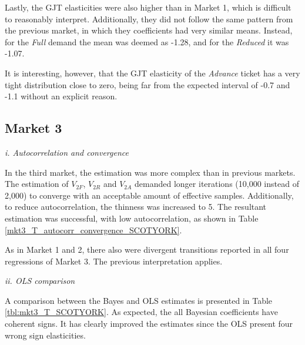 Lastly, the GJT elasticities were also higher than in Market 1, which is difficult to reasonably interpret. Additionally, they did not follow the same pattern from the previous market, in which they coefficients had very similar means. Instead, for the \textit{Full} demand the mean was deemed as -1.28, and for the \textit{Reduced} it was -1.07.

It is interesting, however, that the GJT elasticity of the \textit{Advance} ticket has a very tight distribution close to zero, being far from the expected interval of -0.7 and -1.1 \citep{pdfhv5} without an explicit reason.


\subsection{Market 3}

\textit{i. Autocorrelation and convergence}

In the third market, the estimation was more complex than in previous markets. The estimation of $V_{2F}$, $V_{2R}$ and $V_{2A}$ demanded longer iterations (10,000 instead of 2,000) to converge with an acceptable amount of effective samples. Additionally, to reduce autocorrelation, the thinness was increased to 5. The resultant estimation was successful, with low autocorrelation, as shown in Table \ref{mkt3_T_autocorr_convergence_SCOTYORK}.

As in Market 1 and 2, there also were divergent transitions reported in all four regressions of Market 3. The previous interpretation applies.



\textit{ii. OLS comparison}

A comparison between the Bayes and OLS estimates is presented in Table \ref{tbl:mkt3_T_SCOTYORK}. As expected, the all Bayesian coefficients have coherent signs. It has clearly improved the estimates since the OLS present four wrong sign elasticities.

